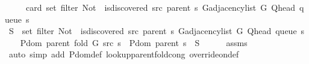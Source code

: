 \begin{isabellebody}
\ \ \ \ \ card\ {\isacharparenleft}{\kern0pt}set\ {\isacharparenleft}{\kern0pt}filter\ {\isacharparenleft}{\kern0pt}Not\ {\isasymcirc}\ is{\isacharunderscore}{\kern0pt}discovered\ src\ {\isacharparenleft}{\kern0pt}parent\ s{\isacharparenright}{\kern0pt}{\isacharparenright}{\kern0pt}\ {\isacharparenleft}{\kern0pt}G{\isachardot}{\kern0pt}adjacency{\isacharunderscore}{\kern0pt}list\ G\ {\isacharparenleft}{\kern0pt}Q{\isacharunderscore}{\kern0pt}head\ {\isacharparenleft}{\kern0pt}queue\ s{\isacharparenright}{\kern0pt}{\isacharparenright}{\kern0pt}{\isacharparenright}{\kern0pt}{\isacharparenright}{\kern0pt}{\isacharparenright}{\kern0pt}{\isachardoublequoteclose}\isanewline
%
\isadelimproof
%
\endisadelimproof
%
\isatagproof
{}\isamarkupfalse%
\ {\isacharminus}{\kern0pt}\isanewline
\ \ \isamarkupfalse%
\ {\isacharquery}{\kern0pt}S\ {\isacharequal}{\kern0pt}\ {\isachardoublequoteopen}set\ {\isacharparenleft}{\kern0pt}filter\ {\isacharparenleft}{\kern0pt}Not\ {\isasymcirc}\ is{\isacharunderscore}{\kern0pt}discovered\ src\ {\isacharparenleft}{\kern0pt}parent\ s{\isacharparenright}{\kern0pt}{\isacharparenright}{\kern0pt}\ {\isacharparenleft}{\kern0pt}G{\isachardot}{\kern0pt}adjacency{\isacharunderscore}{\kern0pt}list\ G\ {\isacharparenleft}{\kern0pt}Q{\isacharunderscore}{\kern0pt}head\ {\isacharparenleft}{\kern0pt}queue\ s{\isacharparenright}{\kern0pt}{\isacharparenright}{\kern0pt}{\isacharparenright}{\kern0pt}{\isacharparenright}{\kern0pt}{\isachardoublequoteclose}\isanewline
\ \ \isamarkupfalse%
\ {\isachardoublequoteopen}P{\isachardot}{\kern0pt}dom\ {\isacharparenleft}{\kern0pt}parent\ {\isacharparenleft}{\kern0pt}fold\ G\ src\ s{\isacharparenright}{\kern0pt}{\isacharparenright}{\kern0pt}\ {\isacharequal}{\kern0pt}\ P{\isachardot}{\kern0pt}dom\ {\isacharparenleft}{\kern0pt}parent\ s{\isacharparenright}{\kern0pt}\ {\isasymunion}\ {\isacharquery}{\kern0pt}S{\isachardoublequoteclose}\isanewline
\ \ \ \ \isamarkupfalse%
\ assms{\isacharparenleft}{\kern0pt}{}{\isacharcomma}{\kern0pt}\ {}{\isacharparenright}{\kern0pt}\isanewline
\ \ \ \ \isamarkupfalse%
\ {\isacharparenleft}{\kern0pt}auto\ simp\ add{\isacharcolon}{\kern0pt}\ P{\isachardot}{\kern0pt}dom{\isacharunderscore}{\kern0pt}def\ lookup{\isacharunderscore}{\kern0pt}parent{\isacharunderscore}{\kern0pt}fold{\isacharunderscore}{\kern0pt}cong{\isacharunderscore}{\kern0pt}{}\ override{\isacharunderscore}{\kern0pt}on{\isacharunderscore}{\kern0pt}def{\isacharparenright}{\kern0pt}\isanewline
\ \ \isamarkupfalse%

\end{isabellebody}
